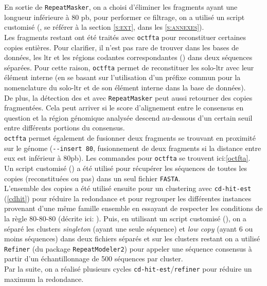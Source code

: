 \documentclass[10pt]{article}
\begin{document}
En sortie de \texttt{RepeatMasker}, on a choisi d'éliminer les fragments ayant une longueur inférieure à 80 pb, pour performer ce filtrage, on a utilisé un script customisé (\linkautorefname{\ref{link1}}, se référer à la section \textsc{\ref{s:ext}}, dans les \textsc{\ref{s:annexes}}). \\

Les fragments restant ont été traités avec \texttt{\acrfull{octfta}} \cite{bailly-bechet_one_2014} pour reconstituer certaines copies entières. Pour clarifier, il n'est pas rare de trouver dans les bases de données, les \acrshort{ltr} et les régions codantes correspondantes (\figureautorefname{ \ref{fig:LTR_example}}) dans deux séquences séparées. Pour cette raison, \texttt{\acrshort{octfta}} permet de reconstituer les solo-\acrshort{ltr} avec leur élément interne (en se basant sur l'utilisation d'un préfixe commun pour la nomenclature du solo-\acrshort{ltr} et de son élément interne dans la base de données). \\
 De plus, la détection des \acrshort{et} avec \texttt{RepeatMasker} peut aussi retourner des copies fragmentées. Cela peut arriver si le score d'alignement entre le consensus en question et la région génomique analysée descend au-dessous d'un certain seuil entre différents portions du consensus. \\
\texttt{\acrshort{octfta}} permet également de fusionner deux fragments se trouvant en proximité sur le génome (\texttt{-{}-insert 80}, fusionnement de deux fragments si la distance entre eux est inférieur à 80pb).
Les commandes pour  \texttt{\acrshort{octfta}} se trouvent ici:\autoref{octfta}. \\
Un script customisé (\linkautorefname{\ref{link2}}) a été utilisé pour récupérer les séquences de toutes les copies (reconstituées ou pas) dans un seul fichier \texttt{FASTA}. \\

L'ensemble des copies a été utilisé ensuite pour un clustering avec \texttt{cd-hit-est} \cite{li_cd-hit_2006} (\autoref{cdhit}) pour réduire la redondance et pour regrouper les différentes instances provenant d'une même famille ensemble en essayant de respecter les conditions de la règle 80-80-80 (décrite ici: ). Puis, en utilisant un script customisé (\linkautorefname{\ref{link2}}), on a séparé les clusters \textit{singleton} (ayant une seule séquence) et \textit{low copy} (ayant 6 ou moins séquences) dans deux fichiers séparés et sur les clusters restant on a utilisé \texttt{Refiner} (du package \texttt{RepeatModeler2}) pour appeler une séquence consensus à partir d'un échantillonnage de 500 séquences par cluster. \\
Par la suite, on a réalisé plusieurs cycles \texttt{cd-hit-est}/\texttt{refiner} pour réduire un maximum la redondance. \\
\end{document}
